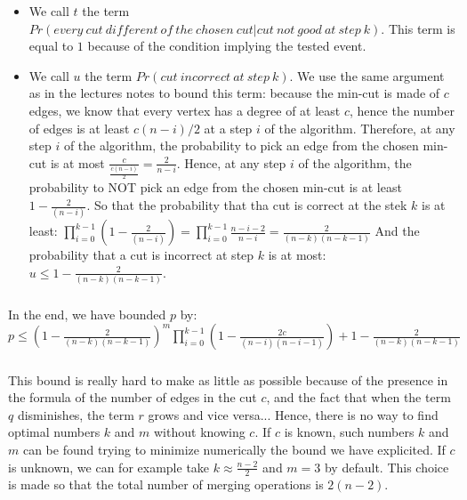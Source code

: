\begin{itemize}
\item We call $t$ the term $Pr(every\: cut\: different\: of\: the\: chosen\: cut | cut\: not\: good\: at\: step\: k)$.
\newline
This term is equal to $1$ because of the condition implying the tested event.
\item We call $u$ the term $Pr(cut\: incorrect\: at\: step\: k)$.
\newline
We use the same argument as in the lectures notes to bound this term: because the min-cut is made of $c$ edges, we know that every vertex has a degree of at least $c$, hence the number of edges is at least $c(n-i)/2$ at a step $i$ of the algorithm.
\newline
Therefore, at any step $i$ of the algorithm, the probability to pick an edge from the chosen min-cut is at most $\frac{c}{\frac{c(n-i)}{2}}=\frac{2}{n-i}$.
\newline
Hence, at any step $i$ of the algorithm, the probability to NOT pick an edge from the chosen min-cut is at least $1-\frac{2}{(n-i)}$.
\newline
So that the probability that tha cut is correct at the stek $k$ is at least:
\newline
$\prod_{i=0}^{k-1}{(1-\frac{2}{(n-i)})} = \prod_{i=0}^{k-1}{\frac{n-i-2}{n-i}} = \frac{2}{(n-k)(n-k-1)}$
\newline
And the probability that a cut is incorrect at step $k$ is at most:
\newline
$u \leq 1 -  \frac{2}{(n-k)(n-k-1)}$.
\end{itemize}
\subparagraph{}
In the end, we have bounded $p$ by:
\newline
$p \leq (1 - \frac{2}{(n-k)(n-k-1)})^m \prod_{i=0}^{k-1}{(1-\frac{2c}{(n-i)(n-i-1)})} + 1 -  \frac{2}{(n-k)(n-k-1)}$
\subparagraph{}
This bound is really hard to make as little as possible because of the presence in the formula of the number of edges in the cut $c$, and the fact that when the term $q$ disminishes, the term $r$ grows and vice versa...
\newline
Hence, there is no way to find optimal numbers $k$ and $m$ without knowing $c$. If $c$ is known, such numbers $k$ and $m$ can be found trying to minimize numerically the bound we have explicited.
\newline
If $c$ is unknown, we can for example take $k \approx \frac{n-2}{2}$ and $m = 3$ by default. This choice is made so that the total number of merging operations is $2(n-2)$.